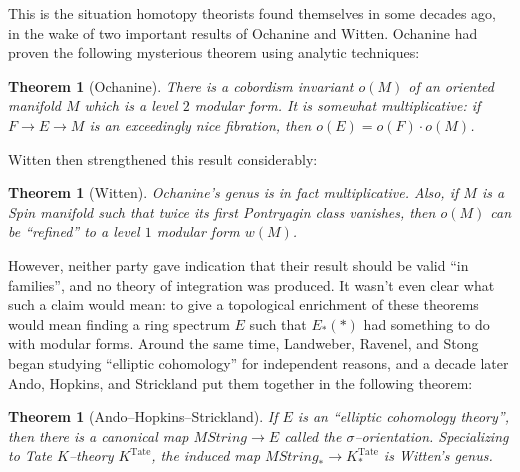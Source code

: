 \documentclass{article}
\newcommand{\<}{\langle}
\renewcommand{\>}{\rangle}
\newcommand{\String}{\mathit{String}}
\newcommand{\Tate}{\mathrm{Tate}}
\numberwithin{equation}{section}
\theoremstyle{plain}
\newtheorem{theorem}[equation]{Theorem}
\theoremstyle{definition}
\theoremstyle{remark}
\begin{document}
This is the situation homotopy theorists found themselves in some decades ago, in the wake of two important results of Ochanine and Witten. Ochanine had proven the following mysterious theorem using analytic techniques:

\begin{theorem}[Ochanine]
There is a cobordism invariant $o(M)$ of an oriented manifold $M$ which is a level $2$ modular form. It is somewhat multiplicative: if $F \to E \to M$ is an exceedingly nice fibration, then $o(E) = o(F) \cdot o(M)$.
\end{theorem}

\noindent Witten then strengthened this result considerably:

\begin{theorem}[Witten]
Ochanine's genus is in fact multiplicative. Also, if $M$ is a Spin manifold such that twice its first Pontryagin class vanishes, then $o(M)$ can be ``refined'' to a level $1$ modular form $w(M)$.
\end{theorem}

\noindent However, neither party gave indication that their result should be valid ``in families'', and no theory of integration was produced.  It wasn't even clear what such a claim would mean: to give a topological enrichment of these theorems would mean finding a ring spectrum $E$ such that $E_*(*)$ had something to do with modular forms.  Around the same time, Landweber, Ravenel, and Stong began studying ``elliptic cohomology'' for independent reasons, and a decade later Ando, Hopkins, and Strickland put them together in the following theorem:

\begin{theorem}[Ando--Hopkins--Strickland]
If $E$ is an ``elliptic cohomology theory'', then there is a canonical map $M\String \to E$ called the $\sigma$--orientation.  Specializing to Tate $K$--theory $K^{\Tate}$, the induced map $M\String_* \to K^{\Tate}_*$ is Witten's genus.
\end{theorem}
\end{document}
